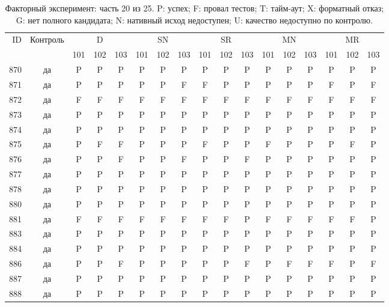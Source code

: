 \begin{table}[p]\centering\footnotesize
\setlength{\tabcolsep}{3pt}
\caption{Факторный эксперимент: часть 20 из 25. P: успех; F: провал тестов; T: тайм-аут; X: форматный отказ; G: нет полного кандидата; N: нативный исход недоступен; U: качество недоступно по контролю.}
\begin{tabular*}{\textwidth}{@{\extracolsep{\fill}}rcccccccccccccccc}\toprule
ID & Контроль & \multicolumn{3}{c}{D} & \multicolumn{3}{c}{SN} & \multicolumn{3}{c}{SR} & \multicolumn{3}{c}{MN} & \multicolumn{3}{c}{MR}\\
\cmidrule(lr){3-5}\cmidrule(lr){6-8}\cmidrule(lr){9-11}\cmidrule(lr){12-14}\cmidrule(lr){15-17}
 & & 101 & 102 & 103 & 101 & 102 & 103 & 101 & 102 & 103 & 101 & 102 & 103 & 101 & 102 & 103\\\midrule
870 & да & P & P & P & P & P & P & P & P & P & P & P & P & P & P & P\\
871 & да & P & P & P & P & P & F & F & P & P & P & P & P & F & P & F\\
872 & да & F & F & F & F & F & F & F & F & F & F & F & F & F & F & F\\
873 & да & P & P & P & P & P & P & P & P & P & P & P & P & P & P & P\\
874 & да & P & P & P & P & P & P & P & P & P & P & P & P & P & P & P\\
875 & да & P & F & F & P & P & P & F & P & P & F & P & P & P & F & P\\
876 & да & P & P & F & P & P & F & P & P & F & P & P & P & P & P & P\\
877 & да & P & P & P & P & P & P & P & P & P & P & P & P & P & P & P\\
878 & да & P & P & P & P & P & P & P & P & P & P & P & P & P & P & P\\
880 & да & P & P & P & P & P & P & P & P & P & P & P & P & P & P & P\\
881 & да & F & F & F & F & F & F & F & F & P & F & F & F & F & F & P\\
883 & да & P & P & P & P & P & P & P & P & P & P & P & P & P & P & P\\
884 & да & P & P & P & P & P & P & P & P & P & P & P & P & P & P & P\\
886 & да & P & P & F & P & P & P & P & P & F & P & F & F & F & P & F\\
887 & да & P & P & P & P & P & P & P & P & P & P & P & P & P & P & P\\
888 & да & P & P & P & P & P & P & P & P & P & P & P & P & P & P & P\\

\end{tabular*}
\end{table}
